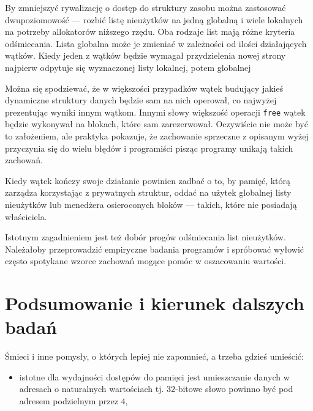 \documentclass[12pt,a4paper,titlepage,twoside]{mwart}
\begin{document}
By zmniejszyć rywalizację o dostęp do struktury zasobu można zastosować
dwupoziomowość --- rozbić listę nieużytków na jedną globalną i wiele lokalnych na
potrzeby allokatorów niższego rzędu.  Oba rodzaje list mają różne kryteria
odśmiecania. Lista globalna może je zmieniać w zależności od ilości
działających wątków. Kiedy jeden z wątków będzie wymagał przydzielenia nowej
strony najpierw odpytuje się wyznaczonej listy lokalnej, potem globalnej

Można się spodziewać, że w większości przypadków wątek budujący jakieś
dynamiczne struktury danych będzie sam na nich operował, co najwyżej
prezentując wyniki innym wątkom. Innymi słowy większość operacji \verb+free+
wątek będzie wykonywał na blokach, które sam zarezerwował. Oczywiście nie może
być to założeniem, ale praktyka pokazuje, że zachowanie sprzeczne z opisanym
wyżej przyczynia się do wielu błędów i programiści pisząc programy unikają
takich zachowań.

Kiedy wątek kończy swoje działanie powinien zadbać o to, by pamięć, którą
zarządza korzystając z prywatnych struktur, oddać na użytek globalnej listy
nieużytków lub menedżera osieroconych bloków --- takich, które nie posiadają
właściciela.

Istotnym zagadnieniem jest też dobór progów odśmiecania list nieużytków.
Należałoby przeprowadzić empiryczne badania programów i spróbować wyłowić
często spotykane wzorce zachowań mogące pomóc w oszacowaniu wartości.

\newpage


\section{Podsumowanie i kierunek dalszych badań}
\hypertarget{Podsumowanie}{}

Śmieci i inne pomysły, o których lepiej nie zapomnieć, a trzeba gdzieś umieścić:
\begin{itemize}
\item istotne dla wydajności dostępów do pamięci jest umieszczanie danych w
adresach o naturalnych wartościach tj. $32$-bitowe słowo powinno być pod
adresem podzielnym przez $4$,
\end{itemize}

\newpage


\nocite{berger00hoard}
\nocite{berger01composing}
\nocite{berger02reconsidering}
\nocite{bonwick94slab}
\nocite{chilimbi00designing}
\nocite{demaine99fast}
\nocite{douglea96malloc}
\nocite{evans06scalable}
\nocite{feng05localityimproving}
\nocite{fitzgibbons00linux}
\nocite{ghemawat07tcmalloc}
\nocite{gorman04linuxvm}
\nocite{iyengar96scalability}
\nocite{johnstone98memory}
\nocite{luby94tight}
\nocite{pas02memory}
\nocite{paul95dynamic}
\nocite{robson71estimate}
\nocite{robson74bounds}
\nocite{robson77worst}
\nocite{stephenson83fastfits}
\nocite{vuillemin80unifying}
\nocite{weinstock88quickfit}



\end{document}
